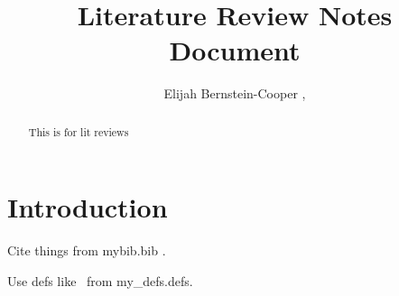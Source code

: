 \documentclass[onecolumn]{emulateapj}
\begin{document}

\title{Literature Review Notes Document}


\author{
  Elijah Bernstein-Cooper , 
}



\begin{abstract}

This is for lit reviews

\end{abstract}

\section{Introduction}
  \label{sec: introduction}

Cite things from mybib.bib \citet{mcconnachie2009}.

Use defs like \hi\ from my_defs.defs.
\end{document}
